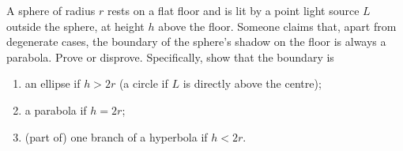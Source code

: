 A sphere of radius $r$ rests on a flat floor and is lit by a point light source $L$ outside the sphere, at height $h$ above the floor. Someone claims that, apart from degenerate cases, the boundary of the sphere's shadow on the floor is always a parabola. Prove or disprove. Specifically, show that the boundary is
\begin{enumerate}
\item[(a)] an ellipse if $h>2r$ (a circle if $L$ is directly above the centre);
\item[(b)] a parabola if $h=2r$;
\item[(c)] (part of) one branch of a hyperbola if $h<2r$.
\end{enumerate}
